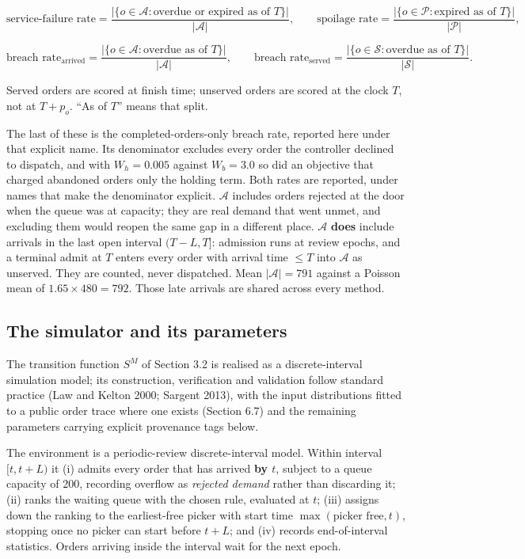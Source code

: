 \documentclass[review,3p,times]{elsarticle}
\theoremstyle{definition}
\begin{document}
\[ \text{service-failure rate} = \frac{|\{o \in \mathcal{A} : \text{overdue or expired as of } T\}|}{|\mathcal{A}|}, \qquad \text{spoilage rate} = \frac{|\{o \in \mathcal{P} : \text{expired as of } T\}|}{|\mathcal{P}|}, \]

\[ \text{breach rate}_{\text{arrived}} = \frac{|\{o \in \mathcal{A} : \text{overdue as of } T\}|}{|\mathcal{A}|}, \qquad \text{breach rate}_{\text{served}} = \frac{|\{o \in \mathcal{S} : \text{overdue as of } T\}|}{|\mathcal{S}|} . \]

Served orders are scored at finish time; unserved orders are scored at
the clock \(T\), not at \(T+p_o\). ``As of \(T\)'' means that split.

The last of these is the completed-orders-only breach rate, reported
here under that explicit name. Its denominator excludes every order the
controller declined to dispatch, and with \(W_h = 0.005\) against
\(W_b = 3.0\) so did an objective that charged abandoned orders only the
holding term. Both rates are reported, under names that make the
denominator explicit. \(\mathcal{A}\) includes orders rejected at the
door when the queue was at capacity; they are real demand that went
unmet, and excluding them would reopen the same gap in a different
place. \(\mathcal{A}\) \textbf{does} include arrivals in the last open
interval \((T-L, T]\): admission runs at review epochs, and a terminal
admit at \(T\) enters every order with arrival time \(\le T\) into
\(\mathcal{A}\) as unserved. They are counted, never dispatched. Mean
\(|\mathcal{A}|=791\) against a Poisson mean of \(1.65\times 480=792\).
Those late arrivals are shared across every method.

\subsection{The simulator and its
parameters}\label{the-simulator-and-its-parameters}

The transition function \(S^M\) of Section 3.2 is realised as a
discrete-interval simulation model; its construction, verification and
validation follow standard practice (Law and Kelton 2000; Sargent 2013),
with the input distributions fitted to a public order trace where one
exists (Section 6.7) and the remaining parameters carrying explicit
provenance tags below.

The environment is a periodic-review discrete-interval model. Within
interval \([t, t+L)\) it (i) admits every order that has arrived
\textbf{by \(t\)}, subject to a queue capacity of 200, recording
overflow as \emph{rejected demand} rather than discarding it; (ii) ranks
the waiting queue with the chosen rule, evaluated at \(t\); (iii)
assigns down the ranking to the earliest-free picker with start time
\(\max(\text{picker free}, t)\), stopping once no picker can start
before \(t+L\); and (iv) records end-of-interval statistics. Orders
arriving inside the interval wait for the next epoch.
\end{document}
